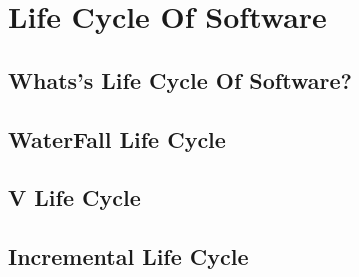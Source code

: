 \section{Life Cycle Of Software}
\subsection{Whats's Life Cycle Of Software?}
\subsection{WaterFall Life Cycle}
\subsection{V Life Cycle}
\subsection{Incremental Life Cycle}
